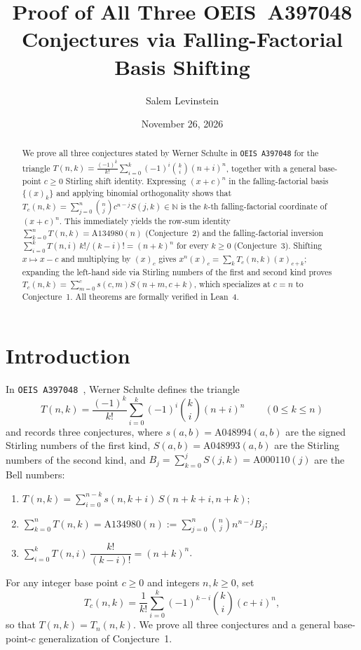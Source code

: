 \documentclass[11pt]{article}
\title{Proof of All Three OEIS~A397048 Conjectures via Falling-Factorial Basis Shifting}
\author{Salem Levinstein}
\date{November 26, 2026}
\begin{document}
\maketitle

\begin{abstract}
We prove all three conjectures stated by Werner Schulte in \texttt{OEIS~A397048} for the triangle $T(n, k) = \frac{(-1)^k}{k!} \sum_{i=0}^{k} (-1)^i \binom{k}{i} (n + i)^n$, together with a general base-point $c \ge 0$ Stirling shift identity. Expressing $(x + c)^n$ in the falling-factorial basis $\{(x)_k\}$ and applying binomial orthogonality shows that $T_c(n, k) = \sum_{j=0}^{n} \binom{n}{j} c^{n - j} S(j, k) \in \mathbb{N}$ is the $k$-th falling-factorial coordinate of $(x + c)^n$. This immediately yields the row-sum identity $\sum_{k=0}^{n} T(n, k) = \mathrm{A134980}(n)$ (Conjecture~2) and the falling-factorial inversion $\sum_{i=0}^{k} T(n, i)\, k!/(k - i)! = (n + k)^n$ for every $k \ge 0$ (Conjecture~3). Shifting $x \mapsto x - c$ and multiplying by $(x)_c$ gives $x^n (x)_c = \sum_k T_c(n, k) (x)_{c + k}$; expanding the left-hand side via Stirling numbers of the first and second kind proves $T_c(n, k) = \sum_{m=0}^{c} s(c, m) S(n + m, c + k)$, which specializes at $c = n$ to Conjecture~1. All theorems are formally verified in Lean~4.
\end{abstract}

\section{Introduction}

In \texttt{OEIS~A397048}~\cite{Schulte2026}, Werner Schulte defines the triangle
\[
  T(n, k) = \frac{(-1)^k}{k!} \sum_{i=0}^{k} (-1)^i \binom{k}{i} (n + i)^n \qquad (0 \le k \le n)
\]
and records three conjectures, where $s(a, b) = \mathrm{A048994}(a, b)$ are the signed Stirling numbers of the first kind, $S(a, b) = \mathrm{A048993}(a, b)$ are the Stirling numbers of the second kind, and $B_j = \sum_{k=0}^{j} S(j, k) = \mathrm{A000110}(j)$ are the Bell numbers:
\begin{enumerate}
  \item $T(n, k) = \sum_{i=0}^{n - k} s(n, k + i)\, S(n + k + i, n + k)$;
  \item $\sum_{k=0}^{n} T(n, k) = \mathrm{A134980}(n) := \sum_{j=0}^{n} \binom{n}{j} n^{n - j} B_j$;
  \item $\sum_{i=0}^{k} T(n, i)\, \dfrac{k!}{(k - i)!} = (n + k)^n$.
\end{enumerate}
For any integer base point $c \ge 0$ and integers $n, k \ge 0$, set
\[
  T_c(n, k) = \frac{1}{k!} \sum_{i=0}^{k} (-1)^{k - i} \binom{k}{i} (c + i)^n,
\]
so that $T(n, k) = T_n(n, k)$. We prove all three conjectures and a general base-point-$c$ generalization of Conjecture~1.
\end{document}
